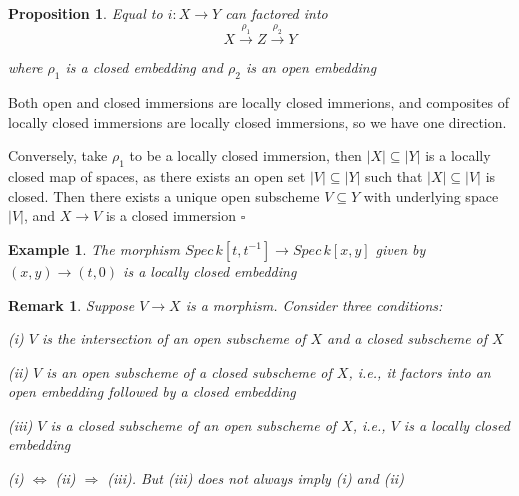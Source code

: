 \documentclass{article}
\newtheorem{example}[theorem]{Example}
\newtheorem{proposition}[theorem]{Proposition}
\newtheorem{remark}[theorem]{Remark}
\newenvironment{Proof}{{\noindent \indent \it Proof:\quad}}{\hfill $\square$\par}
\begin{document}
\begin{proposition}
    Equal to $i: X \to Y$ can factored into
    $$
    X
    \xrightarrow{\rho_1}
    Z
    \xrightarrow{\rho_2}
    Y
    $$

where $\rho_1$ is a closed embedding and $\rho_2$ is an open embedding
\end{proposition}
\begin{Proof}
Both open and closed immersions are locally closed immerions, and composites of locally closed
immersions are locally closed immersions, so we have one direction.

Conversely, take $\rho_1$ to be a locally
closed immersion, then $|X| \subseteq |Y|$ is a locally closed map of spaces, as there exists an open set $|V| \subseteq |Y|$
such that $|X| \subseteq |V|$ is closed. Then there exists a unique open subscheme $V \subseteq Y$ with underlying
space $|V|$, and $X \to V$ is a closed immersion
\end{Proof}

\begin{example}
The morphism $Spec\, k[t, t^{-1}] \to Spec\, k[x, y]$ given by $(x, y) \to (t, 0)$ is a locally closed
embedding
\end{example}

\begin{remark}
Suppose $V \to X$ is a morphism. Consider three conditions:

(i) $V$ is the intersection of an open subscheme of $X$ and a closed subscheme
of $X$

(ii) $V$ is an open subscheme of a closed subscheme of $X$, i.e., it factors into an open embedding followed by a closed embedding

(iii) $V$ is a closed subscheme of an open subscheme of $X$, i.e., $V$ is a locally
closed embedding

(i) $\Leftrightarrow$ (ii) $\Rightarrow$ (iii). But (iii) does not always imply (i) and (ii)
\end{remark}
\end{document}
